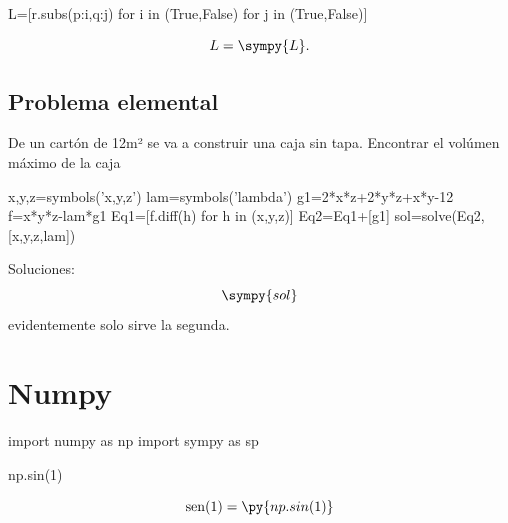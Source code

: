 \begin{sympyblock}
L=[r.subs({p:i,q:j}) for i in (True,False) for j in (True,False)]
\end{sympyblock}

$$L=\sympy{L}.$$

\subsection{Problema elemental}

De un cartón de 12m² se va a construir una caja sin tapa. Encontrar el volúmen máximo de la caja 
\begin{sympyblock}
x,y,z=symbols('x,y,z')
lam=symbols('lambda')
g1=2*x*z+2*y*z+x*y-12
f=x*y*z-lam*g1
Eq1=[f.diff(h) for h in (x,y,z)]
Eq2=Eq1+[g1]
sol=solve(Eq2,[x,y,z,lam])
\end{sympyblock}
Soluciones:
$$\sympy{sol}$$
evidentemente solo sirve la segunda.



\section{Numpy}



\begin{pyblock}
import numpy as np
import sympy as sp
\end{pyblock}




\begin{pyblock}
np.sin(1)
\end{pyblock}

$$\sen(1)=\py{np.sin(1)}$$











\nocite{HansPetterLangtangen1344,AmitSaha1345,WesMcKinney1347,IvanIdris1348, RonanLamy1349,IvanIdris1350, MarkSummerfield1351,PeterFarrell1353}
